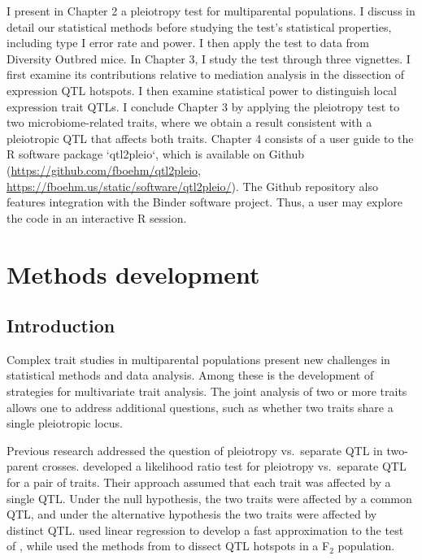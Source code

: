 \documentclass[oneside]{book}\usepackage[]{graphicx}\usepackage[]{color}
\begin{document}
I present in Chapter 2 a pleiotropy test for multiparental populations. I discuss in 
detail our statistical methods before studying the test's statistical properties,
including type I error rate and power. I then apply the test to data from Diversity
Outbred mice. In Chapter 3, I study the test through three vignettes. I first examine
its contributions relative to mediation analysis in the dissection of expression QTL
hotspots. I then examine statistical power to distinguish local expression trait QTLs.
I conclude Chapter 3 by applying the pleiotropy test to two microbiome-related traits,
where we obtain a result consistent with a pleiotropic QTL that affects both traits.
Chapter 4 consists of a user guide to the R software package `qtl2pleio`, which is
available on Github (\url{https://github.com/fboehm/qtl2pleio}, 
\url{https://fboehm.us/static/software/qtl2pleio/}). The Github repository also
features integration with the Binder software project. Thus, a user may explore the
code in an interactive R session. 











\chapter{Methods development}


\section{Introduction}

Complex trait studies in multiparental populations present new
challenges in statistical methods and data analysis. Among these is
the development of strategies for multivariate trait analysis. The
joint analysis of two or more traits allows one to address additional
questions, such as whether two traits share a single pleiotropic
locus.




Previous research addressed the question of pleiotropy vs.\ separate
QTL in two-parent crosses.
\citet{jiang1995multiple} developed a likelihood
ratio test for pleiotropy vs.\ separate QTL for a pair of traits.
Their approach assumed that each trait was affected by a single QTL.
Under the null hypothesis, the two traits were affected by a common
QTL, and under the alternative hypothesis the two traits were affected
by distinct QTL.
\citet{knott2000multitrait} used linear regression to develop a fast
approximation to the test of \citet{jiang1995multiple}, while
\citet{tian2016dissection} used the methods from
\citet{knott2000multitrait} to dissect QTL hotspots in a F$_2$
population.
\end{document}
